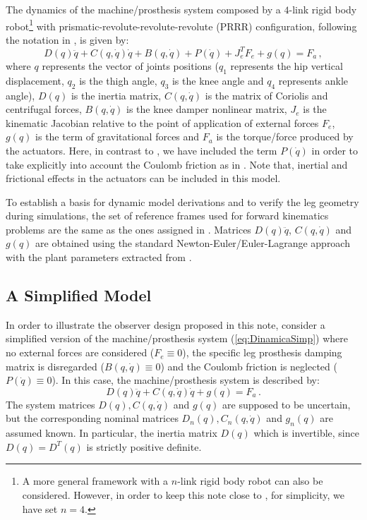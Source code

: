 \documentclass[letterpaper, 10 pt, conference]{ieeeconf}  %
\theoremstyle{plain}
\theoremstyle{definition}
\theoremstyle{remark}
\begin{document}
The dynamics of the machine/prosthesis system composed by a $4$-link rigid body robot\footnote{A more general framework with a $n$-link rigid body robot can also be considered. However, in order to keep this note close to \cite{Richter2015}, for simplicity, we have set $n=4$.}  with prismatic-revolute-revolute-revolute (PRRR) configuration, following the notation in \cite{Richter2015}, is given by:
%
\begin{equation}
D(q)\ddot{q} + C(q,\dot{q})\dot{q}+B(q,\dot{q}) + P(\dot{q}) + J_e^T F_e+g(q) = F_a\,,
\label{eq:Dinamica}
\end{equation}
%
where  $q$ represents the vector of joints positions ($q_1$ represents the hip vertical displacement, $q_2$ is the thigh angle, $q_3$ is the knee angle and $q_4$ represents ankle angle), $D(q)$ is the inertia matrix, $C(q,\dot{q})$ is the matrix of Coriolis and centrifugal forces, $B(q,\dot{q})$ is the knee  damper nonlinear matrix, $J_e$ is the kinematic Jacobian relative to the point of application of external forces $F_e$, $g(q)$ is the term of gravitational forces and $F_a$ is the torque/force produced by the actuators. Here, in contrast to \cite{Richter2015}, we have included the term  $P(\dot{q})$ in order to take explicitly into account the Coulomb friction as in \cite{LeeKhalil2015}. Note that, inertial and frictional effects in the actuators can be included in this model. 

To establish a basis for dynamic model derivations and to verify the leg geometry during simulations, the set of reference frames used for forward kinematics problems are the same as the ones assigned in \cite{Richter2015}. Matrices $D(q)\ddot{q}$, $C(q,\dot{q})$ and $g(q)$ are obtained using the standard Newton-Euler/Euler-Lagrange approach with the plant parameters  extracted from \cite{Richter2015}.

\subsection{A Simplified Model}


In order to illustrate the observer design proposed in this note, consider a simplified version of the machine/prosthesis system (\ref{eq:DinamicaSimp}) where no external forces are considered ($F_e \equiv 0$), the specific leg prosthesis damping matrix is disregarded ($B(q,\dot{q}) \equiv 0$) and the  Coulomb friction is neglected  ($P(\dot{q}) \equiv 0$). In this case, the machine/prosthesis system is described by:
%
\begin{equation}
D(q)\ddot{q} + C(q,\dot{q})\dot{q}+g(q) = F_a\,.
\label{eq:DinamicaSimp}
\end{equation}
%
The system matrices $D(q), C(q,\dot{q})$ and $g(q)$ are supposed to be uncertain, but the corresponding nominal matrices  $D_n(q), C_n(q,\dot{q})$ and $g_n(q)$ are assumed known. In particular, the inertia matrix $D(q)$ which is invertible, since $D(q)=D^T(q)$ is strictly positive definite.
\end{document}
